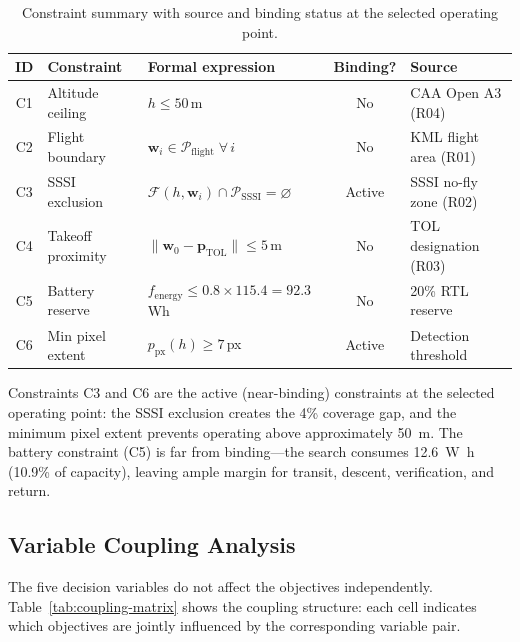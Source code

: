 \begin{table}[H]
  \centering\compactTable
  \caption{Constraint summary with source and binding status at the selected operating point.}\label{tab:constraints}
  \begin{tabularx}{\linewidth}{@{}c l l c X@{}}
    \toprule
    \textbf{ID} & \textbf{Constraint} & \textbf{Formal expression} & \textbf{Binding?} & \textbf{Source} \\
    \midrule
    C1 & Altitude ceiling & $h \leq 50$\,m & No & CAA Open A3 (R04) \\
    C2 & Flight boundary & $\mathbf{w}_i \in \mathcal{P}_{\mathrm{flight}} \;\forall\, i$ & No & KML flight area (R01) \\
    C3 & SSSI exclusion & $\mathcal{F}(h, \mathbf{w}_i) \cap \mathcal{P}_{\mathrm{SSSI}} = \varnothing$ & Active & SSSI no-fly zone (R02) \\
    C4 & Takeoff proximity & $\lVert \mathbf{w}_0 - \mathbf{p}_{\mathrm{TOL}} \rVert \leq 5$\,m & No & TOL designation (R03) \\
    C5 & Battery reserve & $f_{\mathrm{energy}} \leq 0.8 \times 115.4 = 92.3$\,Wh & No & 20\% RTL reserve \\
    C6 & Min pixel extent & $p_{\mathrm{px}}(h) \geq 7$\,px & Active & Detection threshold \\
    \bottomrule
  \end{tabularx}
\end{table}

\noindent Constraints C3 and C6 are the active (near-binding) constraints at the selected operating point: the SSSI exclusion creates the 4\% coverage gap, and the minimum pixel extent prevents operating above approximately \SI{50}{\metre}. The battery constraint (C5) is far from binding---the search consumes \SI{12.6}{\watt\hour} (10.9\% of capacity), leaving ample margin for transit, descent, verification, and return.

\subsection{Variable Coupling Analysis}\label{sec:coupling}

The five decision variables do not affect the objectives independently. Table~\ref{tab:coupling-matrix} shows the coupling structure: each cell indicates which objectives are jointly influenced by the corresponding variable pair.

